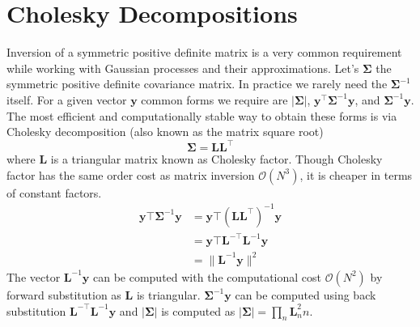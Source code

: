 \section{Cholesky Decompositions}
Inversion of a symmetric positive definite matrix is a very common requirement while working with Gaussian processes and their approximations. Let's $\boldsymbol{\Sigma}$ the symmetric positive definite covariance matrix. In practice we rarely need the $\boldsymbol{\Sigma}^{-1}$ itself. For a given vector $\textbf{y}$ common forms we require are $\left|\boldsymbol{\Sigma}\right|$,  $\textbf{y}^\top\boldsymbol{\Sigma}^{-1}\textbf{y}$, and $\boldsymbol{\Sigma}^{-1}\textbf{y}$. The most efficient and computationally stable way to obtain these forms is via Cholesky decomposition (also known as the matrix square root)
\begin{equation}\label{eq:Cholesky}
 \boldsymbol{\Sigma}=\textbf{L}\textbf{L}^\top
\end{equation}
where $\textbf{L}$ is a triangular matrix known as Cholesky factor. Though Cholesky factor has the same order cost as matrix inversion $\mathcal{O}\left(N^3\right)$, it is cheaper in terms of constant factors.
\begin{equation}\label{eq:Cholesky_dec}
\begin{split}
 \textbf{y}\top\boldsymbol{\Sigma}^{-1}\textbf{y}
    &=\textbf{y}\top\left(\textbf{L}\textbf{L}^\top\right)^{-1}\textbf{y}\\ 
    &=\textbf{y}\top\textbf{L}^{-\top}\textbf{L}^{-1}\textbf{y}\\ 
    &=\parallel\textbf{L}^{-1}\textbf{y}\parallel^2
 \end{split}
\end{equation}
The vector $\textbf{L}^{-1}\textbf{y}$ can be computed with the computational cost $\mathcal{O}\left(N^2\right)$ by forward substitution as $\textbf{L}$ is triangular. $\boldsymbol{\Sigma}^{-1}\textbf{y}$ can be computed using back substitution $\textbf{L}^{-\top}\textbf{L}^{-1}\textbf{y}$ and $\left|\boldsymbol{\Sigma}\right|$ is computed as $\left|\boldsymbol{\Sigma}\right|=\prod_n \textbf{L}^{2}_nn$.

 

